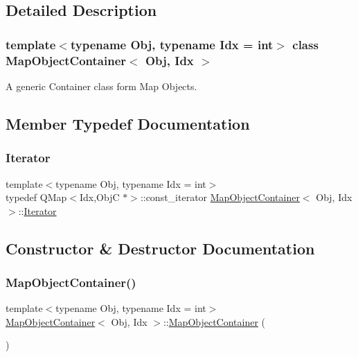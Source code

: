 \subsection{Detailed Description}
\subsubsection*{template$<$typename Obj, typename Idx = int$>$\newline
class Map\+Object\+Container$<$ Obj, Idx $>$}

A generic Container class form Map Objects. 



\subsection{Member Typedef Documentation}
\mbox{\label{class_map_object_container_a744f6940937741a8ffd125e146dc86ab}} 
\subsubsection{\texorpdfstring{Iterator}{Iterator}}
{\footnotesize\ttfamily template$<$typename Obj, typename Idx = int$>$ \\
typedef Q\+Map$<$Idx,ObjC $\ast$$>$\+::const\+\_\+iterator \mbox{\hyperlink{class_map_object_container}{Map\+Object\+Container}}$<$ Obj, Idx $>$\+::\mbox{\hyperlink{class_map_object_container_a744f6940937741a8ffd125e146dc86ab}{Iterator}}}



\subsection{Constructor \& Destructor Documentation}
\mbox{\label{class_map_object_container_ab97ff5f8896b851d2b27e1e991c4d384}} 
\subsubsection{\texorpdfstring{MapObjectContainer()}{MapObjectContainer()}}
{\footnotesize\ttfamily template$<$typename Obj, typename Idx = int$>$ \\
\mbox{\hyperlink{class_map_object_container}{Map\+Object\+Container}}$<$ Obj, Idx $>$\+::\mbox{\hyperlink{class_map_object_container}{Map\+Object\+Container}} (\begin{DoxyParamCaption}{ }\end{DoxyParamCaption})\hspace{0.3cm}{\ttfamily [inline]}}

